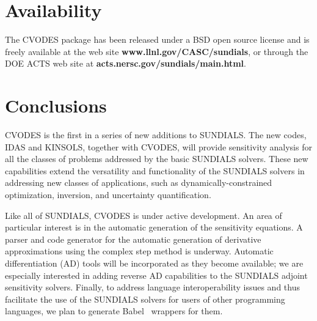 \section{Availability}\label{s:availability}

The CVODES package has been released under a BSD open source license and is 
freely available at the web site
{\bf www.llnl.gov/CASC/sundials},
or through the DOE ACTS web site at
{\bf acts.nersc.gov/sundials/main.html}.

\section{Conclusions}\label{s:conclusions}

CVODES is the first in a series of new additions to SUNDIALS. The new codes,
IDAS and KINSOLS, together with CVODES, will provide sensitivity analysis
for all the classes of problems addressed by the basic SUNDIALS solvers.
These new capabilities extend the versatility and functionality of the SUNDIALS
solvers in addressing new classes of applications, such as dynamically-constrained
optimization, inversion, and uncertainty quantification.

Like all of SUNDIALS, CVODES is under active development.
An area of particular interest is in the automatic generation of the sensitivity 
equations. A parser and code generator for the automatic generation of derivative
approximations using the complex step method is underway.
Automatic differentiation (AD) tools will be incorporated as they become available;
we are especially interested in adding reverse AD capabilities to the SUNDIALS
adjoint sensitivity solvers.
Finally, to address language interoperability issues and thus facilitate the use
of the SUNDIALS solvers for users of other programming languages, we plan to
generate Babel~\cite{KKPR:01} wrappers for them.
 

